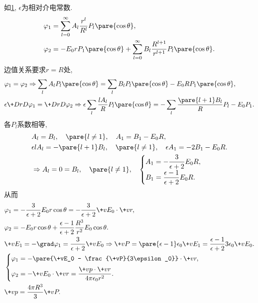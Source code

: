 \documentclass[hidelinks]{ctexart}
\begin{document}
\begin{figure}[ht]
    \centering
    \caption{}
    \label{fig:均匀场中的介质球}
\end{figure}
\begin{sample}
    \begin{ex}
        如\cref{fig:均匀场中的介质球}, $\epsilon$为相对介电常数.
        \begin{align*}
            \varphi_1 &= \sum_{l=0}^\infty A_l \frac{r^l}{R^l}P_l\pare{\cos\theta},\\
            \varphi_2 &= -E_0 r P_1\pare{\cos\theta} + \sum_{l=0}^\infty B_l \frac{R^{l+1}}{r^{l+1}}P_l\pare{\cos\theta}.
        \end{align*}
        边值关系要求$r=R$处,
        \begin{align*}
            & \varphi_1 = \varphi_2 \Rightarrow \sum_l A_l P_l\pare{\cos\theta} = \sum_l B_l P_l\pare{\cos\theta} - E_0 RP_1\pare{\cos\theta}, \\
            & \epsilon \+DrD{\varphi_1} = \+DrD{\varphi_2} \Rightarrow \epsilon \sum_l \frac{lA_l}{R}P_l\pare{\cos\theta} = -\sum_l \frac{\pare{l+1}B_l}{R} P_l - E_0 P_1.
        \end{align*}
        各$P_l$系数相等,
        \begin{align*}
            & A_l = B_l,\quad \pare{l\neq 1},\quad A_1 = B_1 - E_0 R, \\
            & \epsilon lA_l = -\pare{l+1}B_l,\quad \pare{l\neq 1},\quad \epsilon A_1 = -2B_1 - E_0R.\\
            &\Rightarrow A_l = 0 = B_l,\quad \pare{l\neq 1},\quad \begin{cases}
                \displaystyle A_1 = -\frac{3}{\epsilon + 2}E_0 R, \\[.5em]
                \displaystyle B_1 = \frac{\epsilon - 1}{\epsilon + 2}E_0 R.
            \end{cases}
        \end{align*}
        从而
        \begin{align*}
            & \varphi_1 = -\frac{3}{\epsilon + 2}E_0 r\cos\theta = -\frac{3}{\epsilon+2}\+vE_0\cdot \+vr, \\
            & \varphi_2 = -E_0 r\cos\theta + \frac{\epsilon - 1}{\epsilon + 2}\frac{R^3}{r^2}E_0 \cos\theta. \\
            & \+vE_1 = -\grad\varphi_1 = \frac{3}{\epsilon + 2}\+vE_0 \Rightarrow \+vP = %
            \pare{\epsilon - 1}\epsilon_0 \+vE_1 = \frac{\epsilon - 1}{\epsilon + 2}3\epsilon_0 \+vE_0. \\
            & \begin{cases}
                \displaystyle \varphi_1 = -\pare{\+vE_0 - \frac{\+vP}{3\epsilon_0}}\cdot \+vr, \\[.5em]
                \displaystyle \varphi_2 = -\+vE_0 \cdot \+vr = \frac{\+vp\cdot \+vr}{4\pi\epsilon_0 r^2}.
            \end{cases} \\
            & \+vp = \frac{4\pi R^3}{3}\+vP.
        \end{align*}
    \end{ex}
\end{sample}
\end{document}
